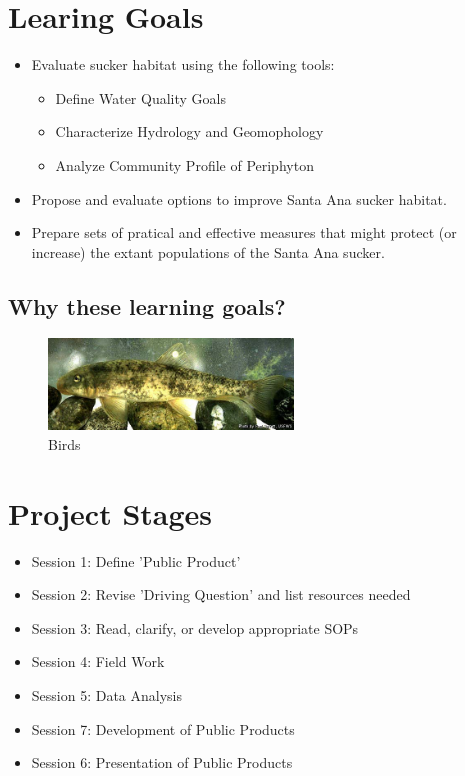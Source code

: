 \documentclass{article}\usepackage[]{graphicx}\usepackage[]{color}
\begin{document}
\section{Learing Goals}

\begin{itemize}
  \item Evaluate sucker habitat using the following tools:
  \begin{itemize}
    \item Define Water Quality Goals
    \item Characterize Hydrology and Geomophology
    \item Analyze Community Profile of Periphyton
  \end{itemize}
  \item Propose and evaluate options to improve Santa Ana sucker habitat.
  \item Prepare sets of pratical and effective measures that might protect (or increase) the extant populations of the Santa Ana sucker.
\end{itemize}

\subsection{Why these learning goals?}

\begin{figure}
  \begin{center}
    \includegraphics[width=0.58\textwidth]{Catostomus_santaanae.jpg}
  \end{center}
  \caption{Birds}
\end{figure}

\section{Project Stages}

\begin{itemize}
  \item Session 1: Define 'Public Product'
  \item Session 2: Revise 'Driving Question' and list resources needed
  \item Session 3: Read, clarify, or develop appropriate SOPs
  \item Session 4: Field Work
  \item Session 5: Data Analysis
  \item Session 7: Development of Public Products
  \item Session 6: Presentation of Public Products
\end{itemize}
\end{document}
